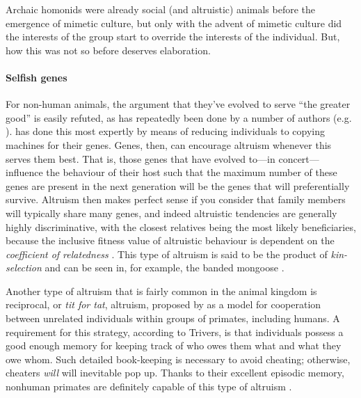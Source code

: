 \documentclass{article}
\begin{document}
Archaic homonids were already social (and altruistic) animals before the
emergence of mimetic culture, but only with the advent of mimetic culture did
the interests of the group start to override the interests of the individual.
But, how this was not so before deserves elaboration.

\paragraph{Selfish genes}


For non-human animals, the argument that they've evolved to serve “the greater
good” is easily refuted, as has repeatedly been done by a number of authors
(e.g. \citealp{hamilton1964, dawkins1976}). \citet{dawkins1976} has done this
most expertly by means of reducing individuals to copying machines for their
genes. Genes, then, can encourage altruism whenever this serves them best. That
is, those genes that have evolved to---in concert---influence the behaviour of
their host such that the maximum number of these genes are present in the next
generation will be the genes that will preferentially survive. Altruism then
makes perfect sense if you consider that family members will typically share
many genes, and indeed altruistic tendencies are generally highly
discriminative, with the closest relatives being the most likely beneficiaries,
because the inclusive fitness value of altruistic behaviour is dependent on the
\textit{coefficient of relatedness} \citep{hamilton1964}. This type of altruism
is said to be the product of \emph{kin-selection} and can be seen in, for
example, the banded mongoose \citep{gilchrist2004a, gilchrist2004b, hodge2005}.

Another type of altruism that is fairly common in the animal kingdom is
reciprocal, or \emph{tit for tat}, altruism, proposed by \citet{trivers1971}
as a model for cooperation between unrelated individuals within groups
of primates, including humans. A requirement for this strategy, according to
Trivers, is that individuals possess a good enough memory for keeping track of who
owes them what and what they owe whom. Such detailed book-keeping is necessary
to avoid cheating; otherwise, cheaters \textit{will} will inevitable pop up.
Thanks to their excellent episodic memory, nonhuman primates are definitely
capable of this type of altruism \citep{waal1996}.
\end{document}
